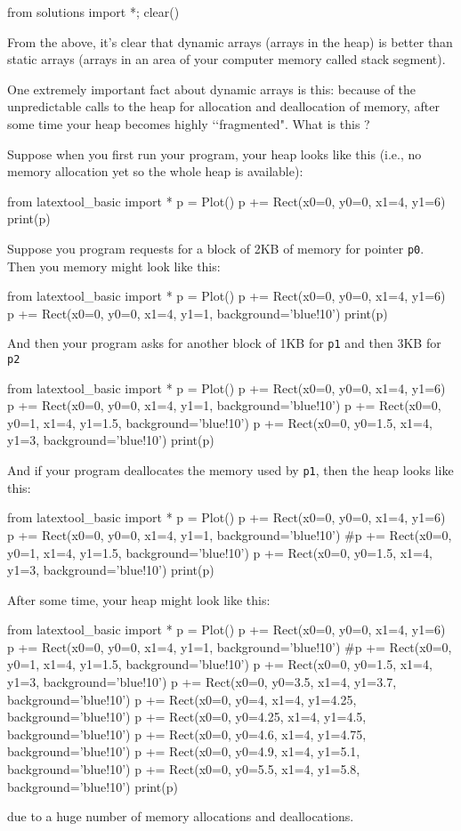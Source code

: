 \begin{python0}
from solutions import *; clear()
\end{python0}

From the above, it's clear that dynamic arrays (arrays in the heap)
is better than static arrays (arrays in an area of your computer
memory called stack segment).

One extremely important fact about dynamic arrays
is this:
because of the unpredictable calls to the heap for
allocation and deallocation of memory, after some time
your heap becomes highly \lq\lq fragmented".
What is this ?

Suppose when you first run your program, your heap looks like this
(i.e., no memory allocation yet so the whole heap is available):
\begin{python}
from latextool_basic import *
p = Plot()
p += Rect(x0=0, y0=0, x1=4, y1=6)
print(p)
\end{python}
Suppose you program requests for a block of 2KB of memory
for pointer \verb!p0!.
Then you memory might look like this:
\begin{python}
from latextool_basic import *
p = Plot()
p += Rect(x0=0, y0=0, x1=4, y1=6)
p += Rect(x0=0, y0=0, x1=4, y1=1, background='blue!10')
print(p)
\end{python}
And then your program asks for another block of 1KB for \verb!p1!
and then 3KB for \verb!p2!
\begin{python}
from latextool_basic import *
p = Plot()
p += Rect(x0=0, y0=0, x1=4, y1=6)
p += Rect(x0=0, y0=0, x1=4, y1=1, background='blue!10')
p += Rect(x0=0, y0=1, x1=4, y1=1.5, background='blue!10')
p += Rect(x0=0, y0=1.5, x1=4, y1=3, background='blue!10')
print(p)
\end{python}
And if your program deallocates the memory used by \verb!p1!, then
the heap looks like this:
\begin{python}
from latextool_basic import *
p = Plot()
p += Rect(x0=0, y0=0, x1=4, y1=6)
p += Rect(x0=0, y0=0, x1=4, y1=1, background='blue!10')
#p += Rect(x0=0, y0=1, x1=4, y1=1.5, background='blue!10')
p += Rect(x0=0, y0=1.5, x1=4, y1=3, background='blue!10')
print(p)
\end{python}
After some time, your heap might look like this:
\begin{python}
from latextool_basic import *
p = Plot()
p += Rect(x0=0, y0=0, x1=4, y1=6)
p += Rect(x0=0, y0=0, x1=4, y1=1, background='blue!10')
#p += Rect(x0=0, y0=1, x1=4, y1=1.5, background='blue!10')
p += Rect(x0=0, y0=1.5, x1=4, y1=3, background='blue!10')
p += Rect(x0=0, y0=3.5, x1=4, y1=3.7, background='blue!10')
p += Rect(x0=0, y0=4, x1=4, y1=4.25, background='blue!10')
p += Rect(x0=0, y0=4.25, x1=4, y1=4.5, background='blue!10')
p += Rect(x0=0, y0=4.6, x1=4, y1=4.75, background='blue!10')
p += Rect(x0=0, y0=4.9, x1=4, y1=5.1, background='blue!10')
p += Rect(x0=0, y0=5.5, x1=4, y1=5.8, background='blue!10')
print(p)
\end{python}
due to a huge number of memory allocations and deallocations.

